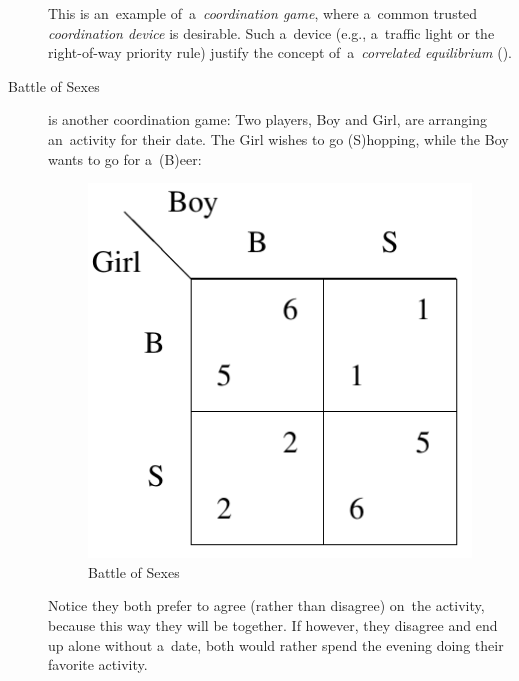 \begin{description}
    This is an~example of~a~\emph{coordination game}, where a~common trusted \emph{coordination device} is desirable.
    Such a~device (e.g., a~traffic light or the right-of-way priority rule) justify the concept of~a~\emph{correlated equilibrium} (\cite[Subsection~1.3.6]{AGT07}).

  \item [Battle of Sexes] is another coordination game:
    Two players, Boy and Girl, are arranging an~activity for their date.
    The Girl wishes to go (S)hopping, while the Boy wants to go for a~(B)eer:
    \begin{figure}[H]
      \centering
      \includegraphics[width=.23\paperwidth]{../img/battle-of-sexes.png}
      \caption{Battle of Sexes}
      \label{fig:battle-of-sexes}
    \end{figure}
    Notice they both prefer to agree (rather than disagree) on~the activity, because this way they will be together.
    If however, they disagree and end up alone without a~date, both would rather spend the evening doing their favorite activity.
\end{description}

